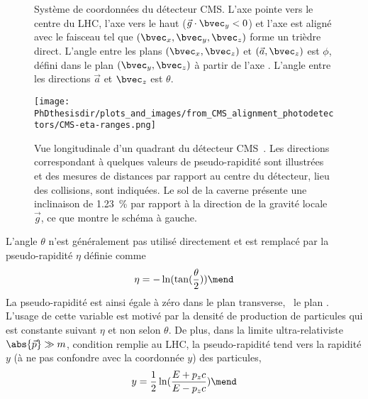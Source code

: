 \begin{figure}[h]
\centering

\caption[Système de coordonnées du détecteur CMS.]{Système de coordonnées du détecteur CMS. L'axe  pointe vers le centre du LHC, l'axe  vers le haut ($\vec{g}\cdot\bvec_y<0$) et l'axe  est aligné avec le faisceau tel que $(\bvec_x, \bvec_y, \bvec_z)$ forme un trièdre direct. L'angle entre les plans $(\bvec_x, \bvec_z)$ et $(\vec{a}, \bvec_z)$ est $\phi$, défini dans le plan $(\bvec_y,\bvec_z)$ à partir de l'axe . L'angle entre les directions $\vec{a}$ et $\bvec_z$ est $\theta$.}
\label{fig-chapter-LHC-section-CMS-subsec-overview_and_coordinates-CMS_3D_phi_theta_defs}
\vspace{\baselineskip}

\texttt{[image: \\PhDthesisdir/plots\_and\_images/from\_CMS\_alignment\_photodetectors/CMS-eta-ranges.png]}
\caption[Vue longitudinale d'un quadrant du détecteur CMS.]{Vue longitudinale d'un quadrant du détecteur CMS~\cite{CMS_alignment_photodetectors}. Les directions correspondant à quelques valeurs de pseudo-rapidité sont illustrées et des mesures de distances par rapport au centre du détecteur, lieu des collisions, sont indiquées. Le sol de la caverne présente une inclinaison de \SI{1.23}{\%} par rapport à la direction de la gravité locale $\vec{g}$, ce que montre le schéma à gauche.}
\label{fig-chapter-LHC-section-CMS-subsec-overview_and_coordinates-CMS-eta-ranges}
\end{figure}
\par L'angle $\theta$ n'est généralement pas utilisé directement et est remplacé par la \og pseudo-rapidité \fg{} $\eta$ définie comme
\begin{equation}
\eta = - \ln(\tan(\frac{\theta}{2}))
\mend
\label{eq-chapter-LHC-section-CMS-subsec-overview_and_coordinates-eta_definition}
\end{equation}
La pseudo-rapidité est ainsi égale à zéro dans le plan transverse, \ie\ le plan .
L'usage de cette variable est motivé par la densité de production de particules qui est constante suivant $\eta$ et non selon $\theta$.
De plus, dans la limite \og ultra-relativiste \fg{} \ie\ $\abs{\vec{p}}\gg m$, condition remplie au LHC, la pseudo-rapidité tend vers la rapidité $y$ (à ne pas confondre avec la coordonnée $y$) des particules,
\begin{equation}
y = \frac{1}{2} \ln(\frac{E+p_zc}{E-p_zc})
\mend
\end{equation}
